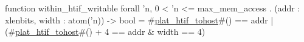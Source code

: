 function within_htif_writable forall 'n, 0 < 'n <= max_mem_access . (addr : xlenbits, width : atom('n)) -> bool =
    #\hyperref[sailRISCVzplatzyhtifzytohost]{plat\_htif\_tohost}#() == addr | (#\hyperref[sailRISCVzplatzyhtifzytohost]{plat\_htif\_tohost}#() + 4 == addr & width == 4)
